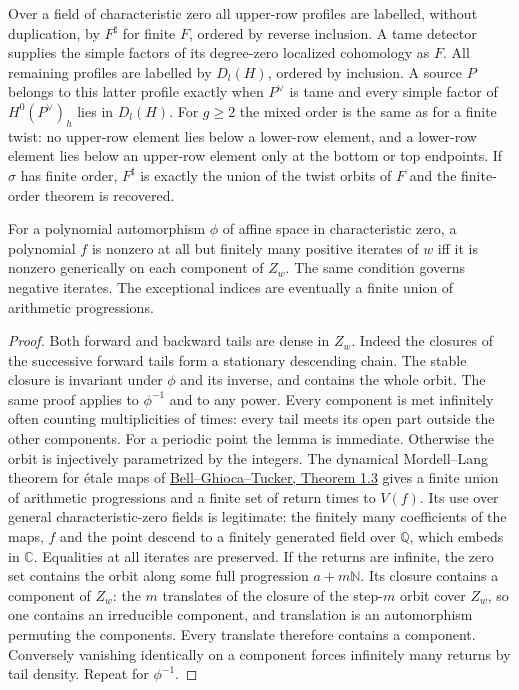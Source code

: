 \documentclass[11pt]{article}
\begin{document}
\begin{thm}\label{geo}
Over a field of characteristic zero all upper-row profiles are labelled,
without duplication, by $F^\sharp$ for finite $F$, ordered by reverse
inclusion. A tame detector supplies the simple factors of its
degree-zero localized cohomology as $F$. All remaining profiles are
labelled by $D_l(H)$, ordered by inclusion. A source $P$ belongs to
this latter profile exactly when $P^\vee$ is tame and every simple
factor of $H^0(P^\vee)_h$ lies in $D_l(H)$. For $g\ge2$ the mixed
order is the same as for a finite twist: no upper-row element lies
below a lower-row element, and a lower-row element lies below an
upper-row element only at the bottom or top endpoints. If $\sigma$
has finite order, $F^\sharp$ is exactly the union of the twist orbits
of $F$ and the finite-order theorem is recovered.
\end{thm}

\begin{lem}\label{return}
For a polynomial automorphism $\phi$ of affine space in characteristic
zero, a polynomial $f$ is nonzero at all but finitely many positive
iterates of $w$ iff it is nonzero generically on each component of
$Z_w$. The same condition governs negative iterates. The exceptional
indices are eventually a finite union of arithmetic progressions.
\end{lem}
\begin{proof}
Both forward and backward tails are dense in $Z_w$. Indeed the closures
of the successive forward tails form a stationary descending chain.
The stable closure is invariant under $\phi$ and its inverse, and contains
the whole orbit. The same proof applies to $\phi^{-1}$ and to any power.
Every component is met infinitely often counting multiplicities of
times: every tail meets its open part outside the other components.
For a periodic point the lemma is immediate. Otherwise the orbit is
injectively parametrized by the integers. The dynamical Mordell--Lang
theorem for \'etale maps of
\href{https://arxiv.org/abs/0808.3266}{Bell--Ghioca--Tucker, Theorem 1.3}
gives a finite union of arithmetic progressions and a finite set of
return times to $V(f)$. Its use over general characteristic-zero
fields is legitimate: the finitely many coefficients of the maps,
$f$ and the point descend to a finitely generated field over $\mathbb Q$,
which embeds in $\mathbb C$. Equalities at all iterates are preserved.
If the returns are infinite, the zero set contains the orbit along
some full progression $a+m\mathbb N$. Its closure contains a component
of $Z_w$: the $m$ translates of the closure of the step-$m$ orbit cover
$Z_w$, so one contains an irreducible component, and translation is
an automorphism permuting the components. Every translate therefore
contains a component. Conversely vanishing identically on a component
forces infinitely many returns by tail density. Repeat for $\phi^{-1}$.
\end{proof}
\end{document}

